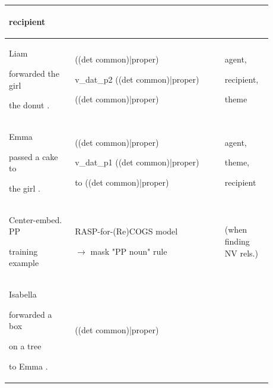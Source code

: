 \documentclass[11pt]{article}
\begin{document}
\begin{table}
\begin{tabular}{p{0.225\linewidth} p{0.50\linewidth} p{0.15\linewidth}}
\begin{tiny}
recipient\end{tiny} \\
\hline
\begin{tiny}Liam 

forwarded the girl 

the donut .\end{tiny} & \begin{tiny}((det common)|proper)

v\_dat\_p2 ((det common)|proper) 

((det common)|proper)\end{tiny} & \begin{tiny}agent,

recipient,

theme\end{tiny} \\
\hline
\begin{tiny}Emma 

passed a cake to 

the girl .\end{tiny} & \begin{tiny}((det common)|proper)

v\_dat\_p1 ((det common)|proper)

to ((det common)|proper)\end{tiny} & \begin{tiny}agent,

theme,

recipient\end{tiny} \\
\hline
\hline
\begin{tiny}Center-embed. PP

training example \end{tiny}&\begin{tiny}RASP-for-(Re)COGS model


$\rightarrow$ mask "PP noun" rule\end{tiny} & \begin{tiny}(when finding NV rels.)\end{tiny} \\
\hline
\hline
\begin{tiny}Isabella 

forwarded a box 

on a tree 

to Emma .\end{tiny} & \begin{tiny}((det common)|proper) 


\end{tiny}
\end{tabular}
\end{table}
\end{document}
